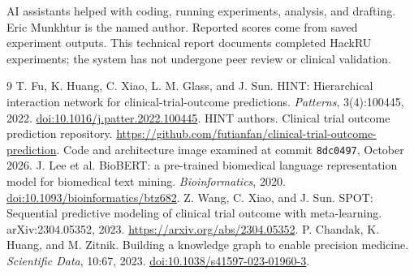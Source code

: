 \documentclass[10pt,letterpaper]{article}
\begin{document}
AI assistants helped with coding, running experiments, analysis, and drafting. Eric Munkhtur is the named author. Reported scores come from saved experiment outputs. This technical report documents completed HackRU experiments; the system has not undergone peer review or clinical validation.

\begin{thebibliography}{9}
 T. Fu, K. Huang, C. Xiao, L. M. Glass, and J. Sun.
HINT: Hierarchical interaction network for clinical-trial-outcome predictions.
\emph{Patterns}, 3(4):100445, 2022.
\href{https://doi.org/10.1016/j.patter.2022.100445}{doi:10.1016/j.patter.2022.100445}.
 HINT authors. Clinical trial outcome prediction repository.
\url{https://github.com/futianfan/clinical-trial-outcome-prediction}.
Code and architecture image examined at commit \texttt{8dc0497}, October 2026.
 J. Lee et al. BioBERT: a pre-trained biomedical language representation model for biomedical text mining.
\emph{Bioinformatics}, 2020.
\href{https://doi.org/10.1093/bioinformatics/btz682}{doi:10.1093/bioinformatics/btz682}.
 Z. Wang, C. Xiao, and J. Sun.
SPOT: Sequential predictive modeling of clinical trial outcome with meta-learning.
arXiv:2304.05352, 2023. \url{https://arxiv.org/abs/2304.05352}.
 P. Chandak, K. Huang, and M. Zitnik.
Building a knowledge graph to enable precision medicine.
\emph{Scientific Data}, 10:67, 2023.
\href{https://doi.org/10.1038/s41597-023-01960-3}{doi:10.1038/s41597-023-01960-3}.
\end{thebibliography}

\appendix
\end{document}

